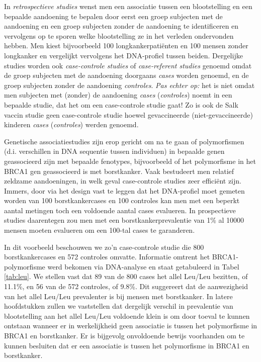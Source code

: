 \documentclass[12pt,dutch,coursenotes]{book}
\theoremstyle{definition}
\theoremstyle{definition}
\theoremstyle{definition}
\theoremstyle{remark}
\let\BeginKnitrBlock\begin \let\EndKnitrBlock\end
\begin{document}
In \emph{retrospectieve studies} wenst men een associatie tussen een
blootstelling en een bepaalde aandoening te bepalen door eerst een groep
subjecten met de aandoening en een groep subjecten zonder de aandoening
te identificeren en vervolgens op te sporen welke blootstelling ze in
het verleden ondervonden hebben. Men kiest bijvoorbeeld 100
longkankerpatiënten en 100 mensen zonder longkanker en vergelijkt
vervolgens het DNA-profiel tussen beiden. Dergelijke studies worden ook
\emph{case-controle studies} of \emph{case-referent studies} genoemd
omdat de groep subjecten met de aandoening doorgaans \emph{cases} worden
genoemd, en de groep subjecten zonder de aandoening \emph{controles}.
\emph{Pas echter op:} het is niet omdat men subjecten met (zonder) de
aandoening \emph{cases} (\emph{controles}) noemt in een bepaalde studie,
dat het om een case-controle studie gaat! Zo is ook de Salk vaccin
studie geen case-controle studie hoewel gevaccineerde
(niet-gevaccineerde) kinderen \emph{cases} (\emph{controles}) werden
genoemd.

\BeginKnitrBlock{example}[Genetische associatiestudies]
\protect\hypertarget{exm:brcaLeu}{}{\label{exm:brcaLeu} \iffalse (Genetische
associatiestudies) \fi{} }
\EndKnitrBlock{example}

Genetische associatiestudies zijn erop gericht om na te gaan of
polymorfismen (d.i. verschillen in DNA sequentie tussen individuen) in
bepaalde genen geassocieerd zijn met bepaalde fenotypes, bijvoorbeeld of
het polymorfisme in het BRCA1 gen geassocieerd is met borstkanker. Vaak
bestudeert men relatief zeldzame aandoeningen, in welk geval
case-controle studies zeer efficiënt zijn. Immers, door via het design
vast te leggen dat het DNA-profiel moet gemeten worden van 100
borstkankercases en 100 controles kan men met een beperkt aantal
metingen toch een voldoende aantal cases evalueren. In prospectieve
studies daarentegen zou men met een borstkankerprevalentie van 1\% al
10000 mensen moeten evalueren om een 100-tal cases te garanderen.

In dit voorbeeld beschouwen we zo'n case-controle studie die 800
borstkankercases en 572 controles omvatte. Informatie omtrent het
BRCA1-polymorfisme werd bekomen via DNA-analyse en staat getabuleerd in
Tabel \ref{tab:leu}. We stellen vast dat 89 van de 800 cases het allel
Leu/Leu bezitten, of 11.1\%, en 56 van de 572 controles, of 9.8\%. Dit
suggereert dat de aanwezigheid van het allel Leu/Leu prevalenter is bij
mensen met borstkanker. In latere hoofdstukken zullen we vaststellen dat
dergelijk verschil in prevalentie van blootstelling aan het allel
Leu/Leu voldoende klein is om door toeval te kunnen ontstaan wanneer er
in werkelijkheid geen associatie is tussen het polymorfisme in BRCA1 en
borstkanker. Er is bijgevolg onvoldoende bewijs voorhanden om te kunnen
besluiten dat er een associatie is tussen het polymorfisme in BRCA1 en
borstkanker.
\end{document}
